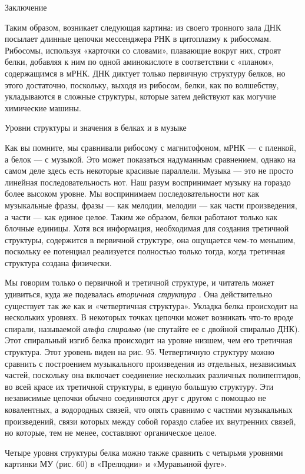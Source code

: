 Заключение

Таким образом, возникает следующая картина: из своего тронного зала ДНК посылает длинные цепочки мессенджера РНК в цитоплазму к рибосомам. Рибосомы, используя «карточки со словами», плавающие вокруг них, строят белки, добавляя к ним по одной аминокислоте в соответствии с «планом», содержащимся в мРНК. ДНК диктует только первичную структуру белков, но этого достаточно, поскольку, выходя из рибосом, белки, как по волшебству, укладываются в сложные структуры, которые затем действуют как могучие химические машины.

Уровни структуры и значения в белках и в музыке

Как вы помните, мы сравнивали рибосому с магнитофоном, мРНК --- с пленкой, а белок --- с музыкой. Это может показаться надуманным сравнением, однако на самом деле здесь есть некоторые красивые параллели. Музыка --- это не просто линейная последовательность нот. Наш разум воспринимает музыку на гораздо более высоком уровне. Мы воспринимаем последовательности нот как музыкальные фразы, фразы --- как мелодии, мелодии --- как части произведения, а части --- как единое целое. Таким же образом, белки работают только как блочные единицы. Хотя вся информация, необходимая для создания третичной структуры, содержится в первичной структуре, она ощущается чем-то меньшим, поскольку ее потенциал реализуется полностью только тогда, когда третичная структура создана физически.

Мы говорим только о первичной и третичной структуре, и читатель может удивиться, куда же подевалась \emph{вторичная структура} . Она действительно существует так же как и «четвертичная структура». Укладка белка происходит на нескольких уровнях. В некоторых точках цепочки может возникать что-то вроде спирали, называемой \emph{альфа спиралью} (не спутайте ее с двойной спиралью ДНК). Этот спиральный изгиб белка происходит на уровне низшем, чем его третичная структура. Этот уровень виден на рис. 95. Четвертичную структуру можно сравнить с построением музыкального произведения из отдельных, независимых частей, поскольку она включает соединение нескольких различных полипептидов, во всей красе их третичной структуры, в единую большую структуру. Эти независимые цепочки обычно соединяются друг с другом с помощью не ковалентных, а водородных связей, что опять сравнимо с частями музыкальных произведений, связи которых между собой гораздо слабее их внутренних связей, но которые, тем не менее, составляют органическое целое.

Четыре уровня структуры белка можно также сравнить с четырьмя уровнями картинки МУ (рис. 60) в «Прелюдии» и «Муравьиной фуге».

